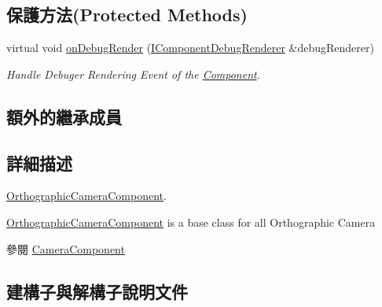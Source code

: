 \subsection*{保護方法(Protected Methods)}
\begin{DoxyCompactItemize}
\item 
virtual void \hyperlink{class_i_dream_sky_1_1_orthographic_camera_component_a09cb1a792cd8e06b3ace4c99f0e89882}{on\+Debug\+Render} (\hyperlink{class_i_dream_sky_1_1_i_component_debug_renderer}{I\+Component\+Debug\+Renderer} \&debug\+Renderer)\hypertarget{class_i_dream_sky_1_1_orthographic_camera_component_a09cb1a792cd8e06b3ace4c99f0e89882}{}\label{class_i_dream_sky_1_1_orthographic_camera_component_a09cb1a792cd8e06b3ace4c99f0e89882}

\begin{DoxyCompactList}\small\item\em Handle Debuger Rendering Event of the \hyperlink{class_i_dream_sky_1_1_component}{Component}. \end{DoxyCompactList}\end{DoxyCompactItemize}
\subsection*{額外的繼承成員}


\subsection{詳細描述}
\hyperlink{class_i_dream_sky_1_1_orthographic_camera_component}{Orthographic\+Camera\+Component}. 

\hyperlink{class_i_dream_sky_1_1_orthographic_camera_component}{Orthographic\+Camera\+Component} is a base class for all Orthographic Camera \begin{DoxySeeAlso}{參閱}
\hyperlink{class_i_dream_sky_1_1_camera_component}{Camera\+Component} 
\end{DoxySeeAlso}


\subsection{建構子與解構子說明文件}

